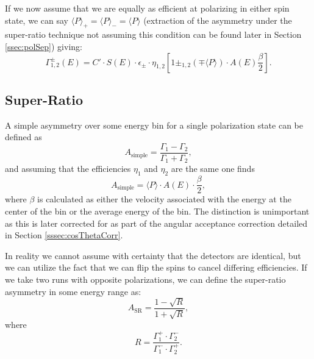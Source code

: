 If we now assume that we are equally as efficient at polarizing in either spin state, we
can say $\langle P \rangle_{+}=\langle P \rangle_{-}=\langle P \rangle$
(extraction of the asymmetry under the super-ratio technique not assuming this
condition can be found later in Section \ref{ssec:polSep}) giving:
%
\begin{equation} \label{eq:decayRate}
  \Gamma_{1,2}^{\pm}\left(E\right)=C' \cdot S(E) \cdot \epsilon_{\pm} \cdot \eta_{1,2}
  \left[ 1 \pm_{1,2} 
    \left(\mp \langle P \rangle \right) \cdot A(E) \frac{\beta}{2} \right].
\end{equation}
%

\subsection{Super-Ratio}

A simple asymmetry over some energy bin for a single 
polarization state can be defined as
%
\begin{equation} 
A_{\mathrm{simple}} = \frac{\Gamma_1 - \Gamma_2}{\Gamma_1 + \Gamma_2}, 
\end{equation}
%
\noindent and assuming that the efficiencies $\eta_1$ and $\eta_2$ are the same one
finds
%
\begin{equation} \label{eq:Asimple}
A_{\mathrm{simple}} = \langle P \rangle \cdot A(E) \cdot \frac{\beta}{2},
\end{equation}
%
\noindent where $\beta$ is calculated as either the velocity associated with the energy 
at the center of the bin or the average energy of the bin. The distinction is
unimportant as this is later corrected for as part of the angular acceptance correction
detailed in Section \ref{sssec:cosThetaCorr}.

In reality we cannot assume with certainty that the detectors are identical, but we can 
utilize the fact that we can flip the spins to cancel differing efficiencies. If we 
take two runs with opposite polarizations, we can define the super-ratio asymmetry in 
some energy range as:
%
\begin{equation} \label{eq:A_SR_frac}
A_{\mathrm{SR}} = \frac{1-\sqrt{R}}{1+\sqrt{R}} ,
\end{equation}
\noindent where 
\begin{equation} \label{eq:R}
 R = \frac{\Gamma_{1}^+ \cdot \Gamma_{2}^-}{\Gamma_{1}^- \cdot \Gamma_{2}^+}.
\end{equation}


